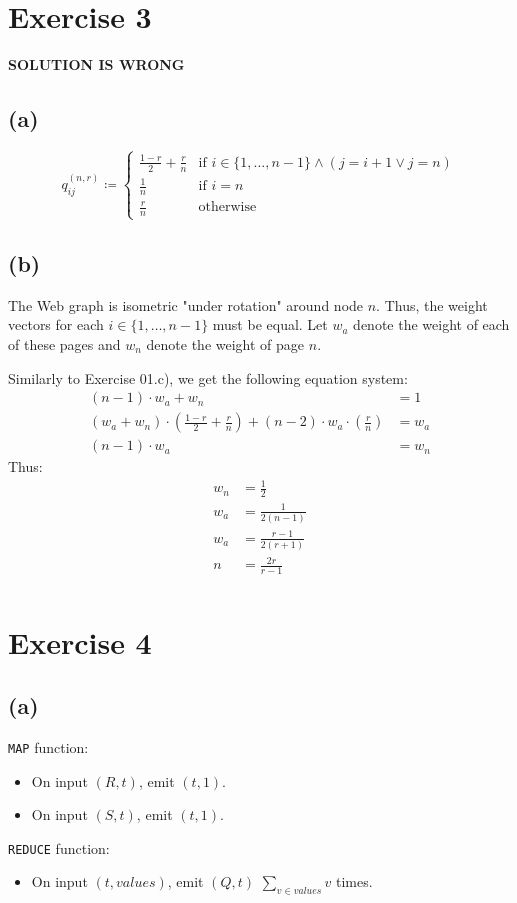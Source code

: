 \documentclass[12pt]{article}
\begin{document}
\section*{Exercise 3}
\textbf{SOLUTION IS WRONG}
\subsection*{(a)}
\begin{equation*}
	q_{ij}^{(n,r)} \coloneqq
	\begin{cases}
		\frac{1-r}{2} + \frac{r}{n} & \text{if } i \in \{1, \dots, n-1\} \land (j = i+1 \lor j=n) \\
		\frac{1}{n} & \text{if } i=n \\
		\frac{r}{n} & \text{otherwise}
	\end{cases}
\end{equation*}

\subsection*{(b)}
The Web graph is isometric "under rotation" around node $n$. Thus, the weight vectors for each $i \in \{1, \dots, n-1\}$ must be equal.
Let $w_a$ denote the weight of each of these pages and $w_n$ denote the weight of page $n$.

Similarly to Exercise 01.c), we get the following equation system:
\begin{align*}
	(n-1) \cdot w_a + w_n &= 1 \\
	(w_a + w_n) \cdot (\frac{1-r}{2} + \frac{r}{n}) + (n-2) \cdot w_a \cdot (\frac{r}{n}) &= w_a \\
	(n-1) \cdot w_a &= w_n
\end{align*}
Thus:
\begin{align*}
	w_n &= \frac{1}{2} \\
	w_a &= \frac{1}{2(n-1)} \\
	w_a &= \frac{r-1}{2(r+1)} \\
	n &= \frac{2r}{r-1} \\
\end{align*}

\section*{Exercise 4}
\subsection*{(a)}
\verb|MAP| function:
\begin{itemize}
	\item	On input $(R, t)$, emit $(t,1)$.
	\item	On input $(S, t)$, emit $(t,1)$.
\end{itemize}
\verb|REDUCE| function:
\begin{itemize}
	\item	On input $(t, values)$, emit $(Q,t)$ $\sum_{v \in values} v$ times.
\end{itemize}
\end{document}
